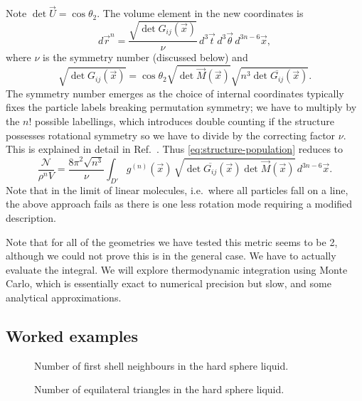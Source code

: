 \documentclass[11pt,twoside]{report}
\begin{document}
Note $\det{\vec{U}} = \cos{\theta_2}$.
The volume element in the new coordinates is
\begin{equation}
  d\vec{r}^n = \frac{\sqrt{\det G_{ij}(\vec{x})}}{\nu}
  \, d^3 \vec{t} \, d^3 \vec{\theta} \, d^{3n-6} \vec{x},
\end{equation}
where $\nu$ is the symmetry number (discussed below) and
\begin{equation}
  \sqrt{\det G_{ij}(\vec{x})} =
  \cos{\theta_2} \sqrt{\det{\vec{M}(\vec{x})}}
  \sqrt{n^3 \det{\overline{G_{ij}}(\vec{x})}}.
\end{equation}
The symmetry number emerges as the choice of internal coordinates typically fixes the particle labels breaking permutation symmetry; we have to multiply by the $n!$ possible labellings, which introduces double counting if the structure possesses rotational symmetry so we have to divide by the correcting factor $\nu$.
This is explained in detail in Ref.\ \cite{Cates2015}.
Thus \eqref{eq:structure-population} reduces to
\begin{equation}\label{eq:structural-partition-function-detailed}
  \frac{\mathcal{N}}{\rho^n V}
  =
  \frac{8\pi^2 \sqrt{n^3}}{\nu} \int_{D'}
  g^{(n)}(\vec{x}) \,
  \sqrt{\det{\overline{G_{ij}}(\vec{x})} \det{\vec{M}(\vec{x})}}
  \, d^{3n-6} \vec{x}.
\end{equation}
Note that in the limit of linear molecules, i.e.\ where all particles fall on a line, the above approach fails as there is one less rotation mode requiring a modified description.

Note that for all of the geometries we have tested this metric seems to be 2, although we could not prove this is in the general case.
We have to actually evaluate the integral.
We will explore thermodynamic integration using Monte Carlo, which is essentially exact to numerical precision but slow, and some analytical approximations.

\subsection{Worked examples}

\begin{figure}
  \missingfigure[figwidth=\linewidth]{}
  \caption{Number of first shell neighbours in the hard sphere liquid.}
\end{figure}

\begin{figure}
  \missingfigure[figwidth=\linewidth]{}
  \caption{Number of equilateral triangles in the hard sphere liquid.}
\end{figure}
\end{document}
